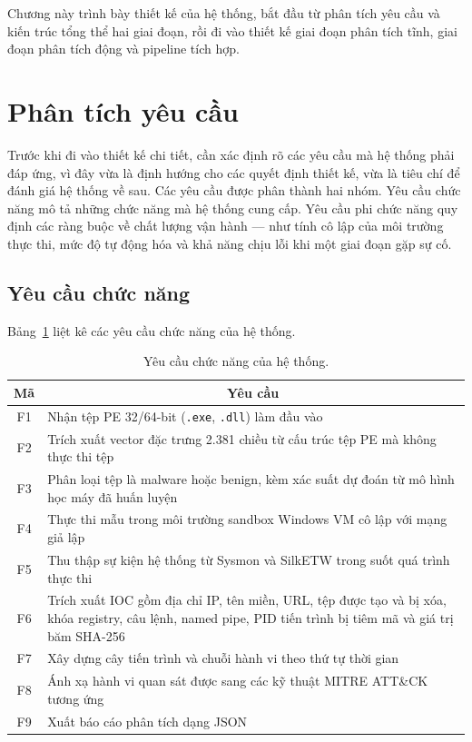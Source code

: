 \documentclass[../DoAn.tex]{subfiles}
\begin{document}
Chương này trình bày thiết kế của hệ thống, bắt đầu từ phân tích yêu
cầu và kiến trúc tổng thể hai giai đoạn, rồi đi vào thiết kế giai đoạn
phân tích tĩnh, giai đoạn phân tích động và pipeline tích hợp.

\section{Phân tích yêu cầu}
\label{section:3.1}

Trước khi đi vào thiết kế chi tiết, cần xác định rõ các yêu cầu mà hệ
thống phải đáp ứng, vì đây vừa là định hướng cho các quyết định thiết
kế, vừa là tiêu chí để đánh giá hệ thống về sau. Các yêu cầu được phân
thành hai nhóm. Yêu cầu chức năng mô tả những chức năng mà hệ thống
cung cấp. Yêu cầu phi chức năng quy định các ràng buộc về chất lượng
vận hành --- như tính cô lập của môi trường thực thi, mức độ tự động
hóa và khả năng chịu lỗi khi một giai đoạn gặp sự cố.

\subsection{Yêu cầu chức năng}
\label{section:3.1.1}
Bảng~\ref{tab:functional_req} liệt kê các yêu cầu chức năng của hệ thống.
\begin{table}[H]
\centering
\caption{Yêu cầu chức năng của hệ thống.}
\label{tab:functional_req}
\begin{tabular}{|c|p{12cm}|}
\hline
\multicolumn{1}{|c|}{\textbf{Mã}} & \multicolumn{1}{c|}{\textbf{Yêu cầu}} \\
\hline
F1 & Nhận tệp PE 32/64-bit (\texttt{.exe}, \texttt{.dll}) làm đầu vào \\
\hline
F2 & Trích xuất vector đặc trưng 2.381 chiều từ cấu trúc tệp PE mà không thực thi tệp \\
\hline
F3 & Phân loại tệp là malware hoặc benign, kèm xác suất dự đoán từ mô hình học máy đã huấn luyện \\
\hline
F4 & Thực thi mẫu trong môi trường sandbox Windows VM cô lập với mạng giả lập \\
\hline
F5 & Thu thập sự kiện hệ thống từ Sysmon và SilkETW trong suốt quá trình thực thi \\
\hline
F6 & Trích xuất IOC gồm địa chỉ IP, tên miền, URL, tệp được tạo và bị xóa,
     khóa registry, câu lệnh, named pipe, PID tiến trình bị tiêm mã và giá trị băm SHA-256 \\
\hline
F7 & Xây dựng cây tiến trình và chuỗi hành vi theo thứ tự thời gian \\
\hline
F8 & Ánh xạ hành vi quan sát được sang các kỹ thuật MITRE ATT\&CK tương ứng \\
\hline
F9 & Xuất báo cáo phân tích dạng JSON \\
\hline
\end{tabular}
\end{table}
\end{document}
